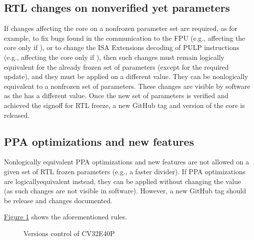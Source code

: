 \documentclass[letterpaper,10pt,english]{sphinxmanual}
\begin{document}
\subsection{RTL changes on non\sphinxhyphen{}verified yet parameters}
\label{\detokenize{core_versions:rtl-changes-on-non-verified-yet-parameters}}
\sphinxAtStartPar
If changes affecting the core on a non\sphinxhyphen{}frozen parameter set are required,
as for example, to fix bugs found in the communication to the FPU (e.g., affecting the core only if ),
or to change the ISA Extensions decoding of PULP instructions (e.g., affecting the core only if ),
then such changes must remain logically equivalent for the already frozen set of parameters (except for the required  update), and they must be applied on a different  value. They can be non\sphinxhyphen{}logically equivalent to a non\sphinxhyphen{}frozen set of parameters.
These changes are visible by software as the  has a different value.
Once the new set of parameters is verified and achieved the sign\sphinxhyphen{}off for RTL freeze,
a new GitHub tag and version of the core is released.


\subsection{PPA optimizations and new features}
\label{\detokenize{core_versions:ppa-optimizations-and-new-features}}
\sphinxAtStartPar
Non\sphinxhyphen{}logically equivalent PPA optimizations and new features are not allowed on a given set
of RTL frozen parameters (e.g., a faster divider).
If PPA optimizations are logically\sphinxhyphen{}equivalent instead, they can be applied without
changing the  value (as such changes are not visible in software).
However, a new GitHub tag should be release and changes documented.

\sphinxAtStartPar
\hyperref[\detokenize{core_versions:rtl-freeze-rules}]{Figure \ref{\detokenize{core_versions:rtl-freeze-rules}}} shows the aforementioned rules.

\begin{figure}[htbp]
\centering
\capstart

\noindent{}
\caption{Versions control of CV32E40P}\label{\detokenize{core_versions:rtl-freeze-rules}}\end{figure}
\end{document}
